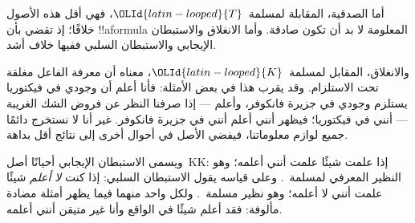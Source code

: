 \documentclass[../../../include/open-logic-section]{subfiles}
\begin{document}
أما الصدقية، المقابلة لمسلمة~$\OLId{latin-looped}{T}$، فهي أقل هذه الأصول خلافًا؛ إذ تقضي بأن
!!a{formula} المعلومة لا بد أن تكون صادقة. وأما الانغلاق والاستبطان
الإيجابي والاستبطان السلبي ففيها خلاف أشد.

والانغلاق، المقابل لمسلمة~$\OLId{latin-looped}{K}$، معناه أن معرفة الفاعل مغلقة تحت الاستلزام.
وقد يقرب هذا في بعض الأمثلة: فأنا أعلم أن وجودي في فيكتوريا يستلزم وجودي
في جزيرة فانكوفر، وأعلم --- إذا صرفنا النظر عن فروض الشك الغريبة --- أنني
في فيكتوريا؛ فيظهر أنني أعلم أنني في جزيرة فانكوفر. غير أنا لا نستخرج
دائمًا جميع لوازم معلوماتنا، فيفضي الأصل في أحوال أخرى إلى نتائج أقل
بداهة.

ويسمى الاستبطان الإيجابي أحيانًا أصل~KK: إذا علمت شيئًا علمت أنني أعلمه؛
وهو النظير المعرفي لمسلمة~. وعلى قياسه يقول الاستبطان السلبي: إذا كنت
\emph{لا أعلم} شيئًا علمت أنني لا أعلمه؛ وهو نظير مسلمة~. ولكل واحد
منهما فيما يظهر أمثلة مضادة مألوفة: فقد أعلم شيئًا في الواقع وأنا غير
متيقن أنني أعلمه.
\end{document}
